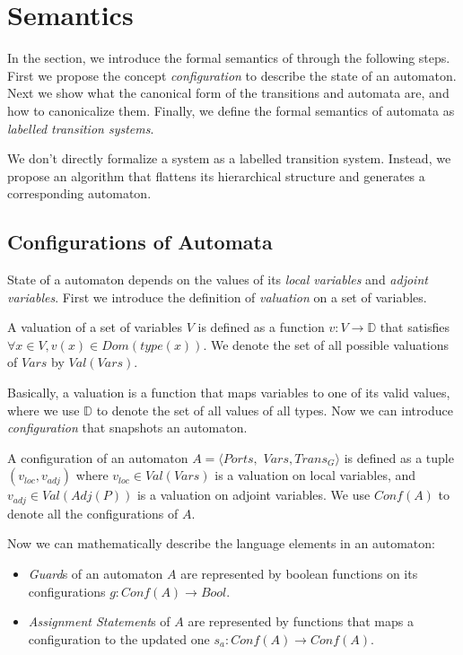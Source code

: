 \section{Semantics}
\label{sec:semantics}

In the section, we introduce the formal semantics of \lang{} through the following steps. First we propose the concept \emph{configuration} to describe the state of an automaton. Next we show what the canonical form of the transitions and automata are, and how to canonicalize them. Finally, we define the formal semantics of automata as \emph{labelled transition systems}.

We don't directly formalize a system as a labelled transition system. Instead, we propose an algorithm that flattens its hierarchical structure and generates a corresponding automaton.


\subsection{Configurations of Automata}
\label{subsec:config}
State of a \lang{} automaton depends on the values of its \emph{local variables} and \emph{adjoint variables}. First we introduce the definition of \emph{valuation} on a set of variables. 

\begin{definition}[Valuation]
A valuation of a set of variables $V$ is defined as a function $v:V\rightarrow \mathbb{D}$ that satisfies $\forall x\in V,v(x)\in Dom(type(x))$. We denote the set of all possible valuations of $Vars$ by $Val(Vars)$.
\end{definition}

Basically, a valuation is a function that maps variables to one of its valid values, where we use $\mathbb{D}$ to denote the set of all values of all types. Now we can introduce \emph{configuration} that snapshots an automaton.

\begin{definition}[Configuration] A configuration of an automaton $A=\langle Ports,$ $Vars,Trans_G\rangle$ is defined as a tuple $(v_{loc},v_{adj})$ where $v_{loc}\in Val(Vars)$ is a valuation on local variables, and $v_{adj}\in Val(Adj(P))$ is a valuation on adjoint variables. We use $Conf(A)$ to denote all the configurations of $A$.
\end{definition}

Now we can mathematically describe the language elements in an automaton:
\begin{itemize}
    \item \emph{Guard}s of an automaton $A$ are represented by boolean functions on its configurations $g:Conf(A)\rightarrow Bool$.
    \item \emph{Assignment Statement}s of $A$ are represented by functions that maps a configuration to the updated one $s_a:Conf(A)\rightarrow Conf(A)$.
\end{itemize}

